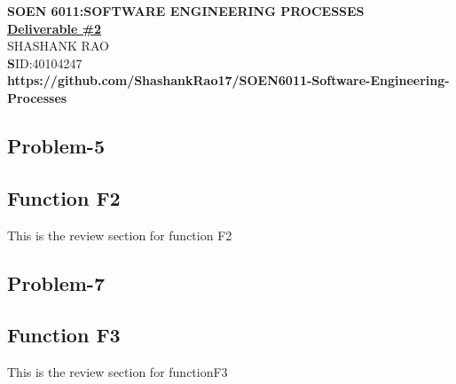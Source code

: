 \documentclass[12pt]{report}
\begin{document}
\begin{center}
	\large\textbf{SOEN 6011:SOFTWARE ENGINEERING PROCESSES}\\
	\vspace{0.05cm}\large\textbf{\underline{Deliverable \#2}}\\
	\vspace{0.05cm}\small{SHASHANK RAO}\\
	\small\textbf SID:40104247\\

	\vspace{0.10cm}\small\textbf{https://github.com/ShashankRao17/SOEN6011-Software-Engineering-Processes}
	
\end{center}

\renewcommand \thesection{\arabic{section}}
\renewcommand \thesubsection{\arabic{section}.\arabic{subsection}}

\begin{center}
	\section{Problem-5}
\end{center}

\subsection{Function F2}This is the review section for function F2\\

\begin{center}
\section{Problem-7}
\end{center}
\subsection{Function F3}This is the review section for functionF3\\
\end{document}

